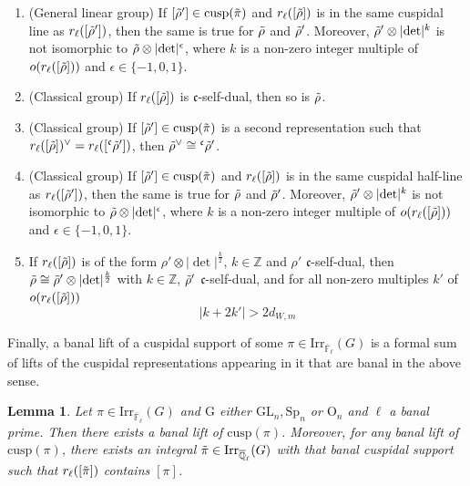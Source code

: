 \documentclass[10pt,a4paper]{article}
\newtheorem{lemma}{Lemma}
\theoremstyle{remark}
\theoremstyle{definition}
\newcommand{\fl}{{\overline{\mathbb{F}}_\ell}}
\newcommand{\ql}{{\overline{\mathbb{Q}}_\ell}}
\newcommand{\tpi}{\Tilde{\pi}}
\newcommand{\trho}{{\Tilde{\rho}}}
\newcommand{\irr}{\mathrm{Irr}}
\newcommand{\mG}{\mathrm{G}   }
\newcommand{\rl}{r_\ell}
\newcommand{\cusp}{\mathrm{cusp}}
\newcommand{\ZZ}{\mathbb{Z}}
\newcommand{\Sp}{\mathrm{Sp}}
\newcommand{\Oo}{\mathrm{O}}
\newcommand{\fc}{\mathfrak{c}}
\begin{document}
\begin{enumerate}
    \item (General linear group) If $[\trho']\in \cusp(\tpi)$ and $\rl([\trho])$ is in the same cuspidal line as $\rl([\trho'])$, then the same is true for $\trho$ and $\trho'$. Moreover, $\trho'\otimes\lvert\det\rvert^k$ is not isomorphic to $\trho\otimes\lvert\det\rvert^\epsilon$, where $k$ is a non-zero integer multiple of $o(\rl([\trho]))$ and $\epsilon\in\{-1,0,1\}$.
    \item (Classical group) If $\rl([\trho])$ is $\fc$-self-dual, then so is $\trho$.
    \item (Classical group) If $[\trho']\in \cusp(\tpi)$ is a second representation such that $\rl([\trho])^\lor=\rl([{}^\fc\trho'])$, then $\trho^\lor\cong{}^\fc\trho'$.
    \item (Classical group) If $[\trho']\in \cusp(\tpi)$ and $\rl([\trho])$ is in the same cuspidal half-line as $\rl([\trho'])$, then the same is true for $\trho$ and $\trho'$. Moreover, $\trho'\otimes\lvert\det\rvert^k$ is not isomorphic to $\trho\otimes\lvert\det\rvert^\epsilon$, where $k$ is a non-zero integer multiple of $o(\rl([\trho]))$ and $\epsilon\in\{-1,0,1\}$.
    \item If $\rl([\trho])$ is of the form $\rho'\otimes\lvert\det\rvert^\frac{k}{2}$, $k\in \ZZ$ and $\rho'$ $\fc$-self-dual, then $\trho\cong\trho'\otimes\lvert\det\rvert^\frac{k}{2}$ with $k\in\ZZ$, $\trho'$ $\fc$-self-dual, and for all non-zero multiples $k'$ of $o(\rl([\trho]))$
    \[\lvert k+2k'\rvert>2d_{W,m} \]
\end{enumerate}
 Finally, a banal lift of a cuspidal support of some $\pi\in\irr_\fl(G)$ is a formal sum of lifts of the cuspidal representations appearing in it that are banal in the above sense.
\begin{lemma}\label{L:cuspsupext}
    Let $\pi\in\irr_\fl(G)$ and $\mG$ either $\mathrm{GL}_n,\Sp_n$ or $\Oo_n$ and $\ell$ a banal prime. Then there exists a banal lift of $\cusp(\pi)$. Moreover, for any banal lift of $\cusp(\pi)$, there exists an integral $\tpi\in\irr_\ql(G)$ with that banal cuspidal support such that $\rl([\tpi])$ contains $[\pi]$.
\end{lemma}
\end{document}
